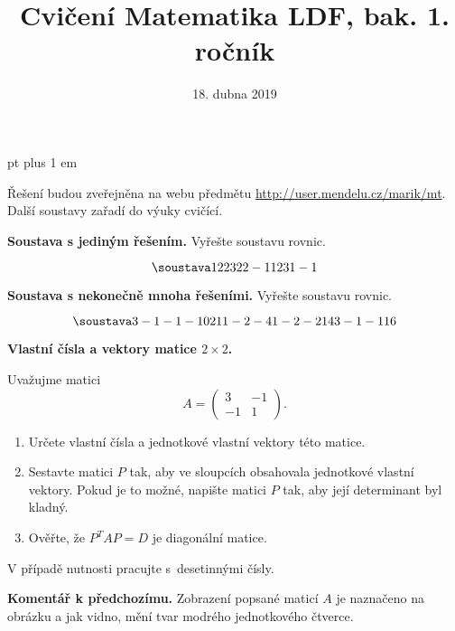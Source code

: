 \documentclass{article}
\let\oldtextbf\textbf
\def\textbf#1{%
  \oldtextbf{\color{red} #1}}
\begin{document}
 pt plus 1 em
\title{Cvičení Matematika LDF, bak. 1. ročník}
\date{18. dubna 2019}

\maketitle

Řešení budou zveřejněna na webu předmětu \url{http://user.mendelu.cz/marik/mt}.
Další soustavy zařadí do výuky cvičící.

\newpage


\textbf{Soustava s jediným řešením.} Vyřešte soustavu rovnic.

\shorthandoff{-}
\begin{equation*}
\soustava
1 2 2 3
2 2 -1 1
2 3 1 -1

\end{equation*}

\newpage
\textbf{Soustava s nekonečně mnoha řešeními.} Vyřešte soustavu rovnic.

\begin{equation*}
\soustava
3 -1 -1 -1 0
2 1 1 -2 -4
1 -2 -2 1 4
3 -1 -1 1 6

\end{equation*}

\newpage
\textbf{Vlastní čísla a vektory matice $2\times 2$.}

Uvažujme matici
\begin{equation*} A=
  \begin{pmatrix}
  3 & -1\\
  -1 & 1
\end{pmatrix}.
\end{equation*}
\begin{enumerate}
\item Určete vlastní čísla a jednotkové vlastní vektory této matice.
\item Sestavte matici $P$ tak, aby ve sloupcích obsahovala jednotkové vlastní vektory.
Pokud je to možné, napište matici $P$ tak, aby její determinant byl kladný.
\item Ověřte, že  $P^TAP=D$  je diagonální matice.
\end{enumerate}

V případě nutnosti pracujte s~desetinnými čísly.

\newpage \textbf{Komentář k předchozímu.} Zobrazení popsané maticí $A$
je naznačeno na obrázku a jak vidno, mění tvar modrého jednotkového čtverce.
\end{document}

